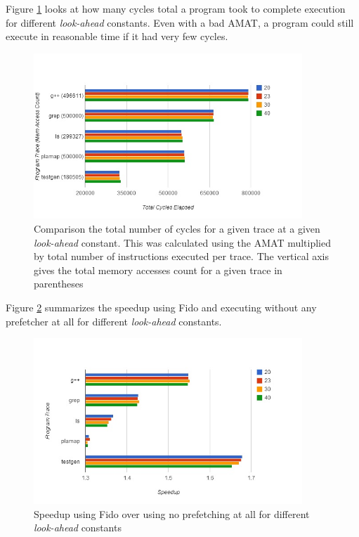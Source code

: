 \documentclass[11pt]{article}
\begin{document}
Figure \ref{TotCyl} looks at how many cycles total a program took to complete execution for different \textit{look-ahead} constants. Even with a bad AMAT, a program could still execute in reasonable time if it had very few cycles. 
\begin{figure}[H]

\centering
\includegraphics[width=0.9\textwidth]{TotalCycleExecuted.jpg}
\caption{ \label{TotCyl} Comparison the total number of cycles for a given trace at a given \textit{look-ahead} constant. This was calculated using the AMAT multiplied by total number of instructions executed per trace. The vertical axis gives the total memory accesses count for a given trace in parentheses}
\end{figure}



Figure \ref{speedup} summarizes the speedup using Fido and executing without any prefetcher at all for different \textit{look-ahead} constants.  
\begin{figure}[H]

\centering
\includegraphics[width=0.9\textwidth]{SpeedupFromNoPrefetcher.jpg}
\caption{ \label{speedup} Speedup using Fido over using no prefetching at all for different \textit{look-ahead} constants}
\end{figure}
\end{document}
